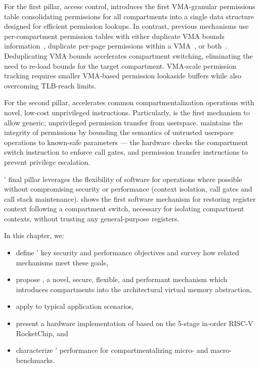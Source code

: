 For the first pillar, access control, \seccells introduces the 
first VMA-granular permissions table consolidating permissions for
all compartments into a single data structure designed for
efficient permission lookups.
In contrast, previous mechanisms use per-compartment permission tables 
with either duplicate VMA bounds information~\cite{WitchelCA02MMP},
duplicate per-page permissions within a 
VMA~\cite{ERIMOberwagner19,SchrammelWSS0MG20Donky},
or both~\cite{DuHXZC19XPC,LittonVE0BD16}.
Deduplicating VMA bounds accelerates compartment switching, eliminating
the need to re-load bounds for the target compartment.
VMA-scale permission tracking requires smaller VMA-based permission
lookaside buffers while also overcoming TLB-reach limits.

For the second pillar, 
\seccells accelerates common compartmentalization operations with
novel, low-cost unprivileged instructions.
Particularly, \seccells is the first mechanism to
allow generic, unprivileged permission transfer from userspace.
\seccells maintains the integrity of permissions by bounding 
the semantics of untrusted userspace operations to known-safe parameters --- 
the hardware checks the compartment switch instruction to enforce call gates,
and permission transfer instructions to prevent privilege escalation.

\seccells' final pillar leverages the flexibility of software for 
operations where possible without compromising security or 
performance (context isolation, call gates and call stack maintenance).
\seccells{} shows the first software mechanism for restoring register context
following a compartment switch, necessary for isolating compartment contexts,
without trusting any general-purpose registers.

In this chapter, we:
\begin{itemize}
  \item define \seccells' key security and performance objectives
        and survey how related mechanisms meet these goals,
  \item propose \seccells, a novel, secure, flexible, and performant 
        mechanism which introduces compartments 
        into the architectural virtual memory abstraction,
  \item apply \seccells to typical application scenarios,
  \item present a hardware implementation of \seccells based on the 
        5-stage in-order RISC-V RocketChip, and
  \item characterize \seccells' performance for compartmentalizing
        micro- and macro-benchmarks.
\end{itemize}

